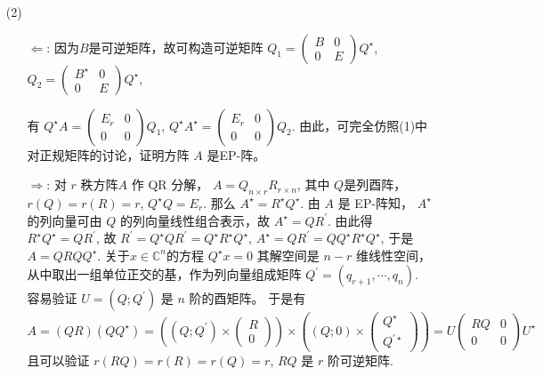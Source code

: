 \documentclass{article}
\begin{document}
\begin{spacing}{1.5}
\begin{enumerate}
\begin{itemize}
            \item [(2)] 
            \begin{enumerate}
                \item [$\Leftarrow$:] 因为$B$是可逆矩阵，故可构造可逆矩阵 $Q_1 = \left(\begin{array}{cc}B&0\\0&E\end{array}\right)Q^\star$, $Q_2=\left(\begin{array}{cc}B^\star&0\\0&E\end{array}\right)Q^\star$, 
                
                有 $Q^\star A = \left(\begin{array}{cc}E_r&0\\0&0\end{array}\right)Q_1$, 
                                    $Q^\star A^\star = \left(\begin{array}{cc}E_r&0\\0&0\end{array}\right)Q_2$.
                由此，可完全仿照(1)中对正规矩阵的讨论，证明方阵 $A$ 是EP-阵。
                \item [$\Rightarrow$:] 对 $r$ 秩方阵$A$ 作 QR 分解， $A = Q_{n\times r}R_{r\times n}$, 其中 $Q$是列酉阵，$r(Q) = r(R) = r$, $Q^\star Q = E_r$.
                那么 $A^\star = R^\star Q^\star$. 由 $A$ 是 EP-阵知， $A^\star$ 的列向量可由 $Q$ 的列向量线性组合表示，故 $A^\star = QR^\prime$.
                由此得 $R^\star Q^\star = QR^\prime$, 故 $R^\prime = Q^\star QR^\prime = Q^\star R^\star Q^\star$, $A^\star = QR^\prime = QQ^\star R^\star Q^\star$, 于是 $A = QRQQ^\star$.
                关于$x\in\mathbb{C}^n$的方程 $Q^\star x = 0$ 其解空间是 $n-r$ 维线性空间，从中取出一组单位正交的基，作为列向量组成矩阵 $Q^\prime = (q_{r+1}, \cdots, q_n)$. 容易验证 $U = (Q; Q^\prime)$ 是 $n$ 阶的酉矩阵。
                于是有 $$A = (QR)(QQ^\star) = \left(\left(Q; Q^\prime\right)\times\left(\begin{array}{c}R\\0\end{array}\right)\right)\times\left(\left(Q;0\right)\times\left(\begin{array}{c}Q^\star\\Q^{\prime\star}\end{array}\right)\right) = U\left(\begin{array}{cc}RQ&0\\0&0\end{array}\right)U^\star$$
                且可以验证 $r(RQ) = r(R) = r(Q) = r$, $RQ$ 是 $r$ 阶可逆矩阵.
            \end{enumerate}
        \end{itemize}


\end{enumerate}
\end{spacing}
\end{document}
